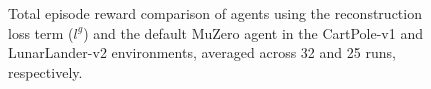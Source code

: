 \begin{figure}[ht]
    \caption{Total episode reward comparison of agents using the reconstruction loss term ($l^g$) and the default MuZero agent in the CartPole-v1 and LunarLander-v2 environments, averaged across 32 and 25 runs, respectively.}
    \label{fig:reconstruction_results}
\end{figure}

